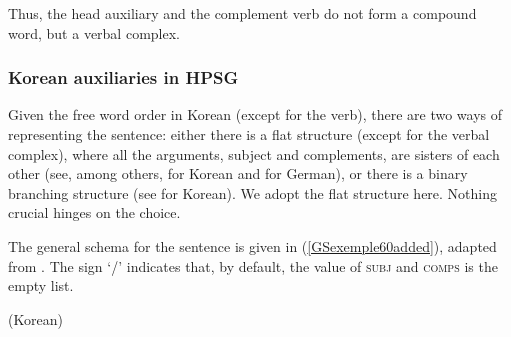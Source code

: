 {\eal
	\label{GSexemple57added-ab}
	\label{GSexemple57added-a}
	
	\label{GSexemple57added-b}
\zl

Thus, the head auxiliary and the complement verb do not form a compound word, but a verbal
complex.

\subsubsection{Korean auxiliaries in HPSG}\label{GSsection4.2.3}

Given the free word order in Korean (except for the verb), there are two ways of representing the sentence: either there is a flat structure (except for the verbal complex), where all the arguments, subject and complements, are sisters of each other (see, among others, \citealt{Chung98a-u} for Korean and \citealt{HN98a} for German), or there is a binary branching structure (see \citealt{Kim2016a-u} for Korean). We adopt the flat structure here. Nothing crucial hinges on the choice.

The general schema for the sentence is given in (\ref{GSexemple60added}), adapted from \cite[178]{Chung98a-u}. The sign `/' indicates that, by default, the value of \textsc{subj} and \textsc{comps} is the empty list.


\ea
\label{GSexemple60added}
 (Korean) \impl \\
\z

}
